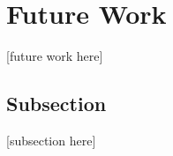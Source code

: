 \section{Future Work}
\label{section:futurework}
[future work here]

\subsection{Subsection}
[subsection here]
